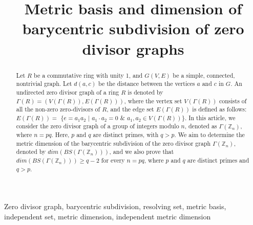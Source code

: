 \documentclass[]{interact}
\theoremstyle{plain}%
\theoremstyle{definition}
\theoremstyle{remark}
\begin{document}
	
	
	\title{Metric basis and dimension of barycentric subdivision of zero divisor graphs}
	
	\author{
		}
	
	\maketitle
	
	\begin{abstract}
		Let $R$ be a commutative ring with unity 1, and $ G(V,E)$ be a simple, connected, nontrivial graph. Let $d(a,c)$ be the distance between the vertices $a$ and $c $ in $G$. An undirected zero divisor graph of a ring $R$ is denoted by $\Gamma(R) = (V(\Gamma(R)), E(\Gamma(R)))$, where the vertex set $V(\Gamma(R))$ consists of all the non-zero zero-divisors of $R$, and the edge set $E(\Gamma(R))$ is defined as follows: $E(\Gamma(R)) = $ $\{e = a_1a_2$ $ |$ $
a_1 \cdot a_2 = 0$  $\&$ $  a_1, a_2 \in V(\Gamma(R))\}$. In this article, we consider the zero divisor graph of a group of integers modulo \(n\), denoted as \(\Gamma(\mathbb{Z}_n)\), where \(n=pq\). Here, \(p\) and \(q\) are distinct primes, with \(q > p\). We aim to determine the metric dimension of the barycentric subdivision of the zero divisor graph \(\Gamma(\mathbb{Z}_n)\), denoted by \(dim(BS(\Gamma(\mathbb{Z}_n)))\), and we also prove that \(dim(BS(\Gamma(\mathbb{Z}_n)))\geq q-2\) for every \(n=pq\), where \(p\) and \(q\) are distinct primes and $q>p$.
	\end{abstract}
	
	\begin{keywords}
Zero divisor graph, barycentric subdivision, resolving set, metric basis, independent set, metric dimension, independent metric dimension
	\end{keywords}
	
\end{document}
